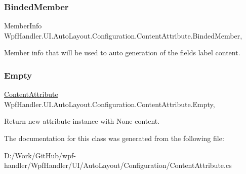 \subsubsection{\texorpdfstring{Binded\+Member}{BindedMember}}
{\footnotesize\ttfamily Member\+Info Wpf\+Handler.\+U\+I.\+Auto\+Layout.\+Configuration.\+Content\+Attribute.\+Binded\+Member\hspace{0.3cm}{\ttfamily [get]}, {}}



Member info that will be used to auto generation of the field\textquotesingle{}s label content. 

\mbox{\label{class_wpf_handler_1_1_u_i_1_1_auto_layout_1_1_configuration_1_1_content_attribute_a7342c312b16ecde3884a20ae56879485}} 
\subsubsection{\texorpdfstring{Empty}{Empty}}
{\footnotesize\ttfamily \mbox{\hyperlink{class_wpf_handler_1_1_u_i_1_1_auto_layout_1_1_configuration_1_1_content_attribute}{Content\+Attribute}} Wpf\+Handler.\+U\+I.\+Auto\+Layout.\+Configuration.\+Content\+Attribute.\+Empty\hspace{0.3cm}{\ttfamily [static]}, {\ttfamily [get]}}



Return new attribute instance with None content. 



The documentation for this class was generated from the following file\+:\begin{DoxyCompactItemize}
\item 
D\+:/\+Work/\+Git\+Hub/wpf-\/handler/\+Wpf\+Handler/\+U\+I/\+Auto\+Layout/\+Configuration/Content\+Attribute.\+cs\end{DoxyCompactItemize}
